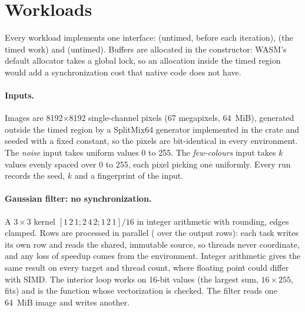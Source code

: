 \section{Workloads}
\label{sec:workloads}

Every workload implements one interface:  (untimed, before
each iteration),  (the timed work) and  (untimed).
Buffers are allocated in the constructor: WASM's default allocator takes a
global lock, so an allocation inside the timed region would add a
synchronization cost that native code does not have.

\paragraph{Inputs.} Images are 8192$\times$8192 single-channel 
pixels (67 megapixels, 64~MiB), generated outside the timed region by a
SplitMix64 generator implemented in the crate and seeded with a fixed
constant, so the pixels are bit-identical in every environment. The
\emph{noise} input takes uniform values 0 to 255. The \emph{few-colours}
input takes $k$ values evenly spaced over 0 to 255, each pixel picking one
uniformly. Every run records the seed, $k$ and a fingerprint of the input.

\paragraph{Gaussian filter: no synchronization.} A $3\times3$ kernel
$[1\,2\,1; 2\,4\,2; 1\,2\,1]/16$ in integer arithmetic with rounding, edges
clamped. Rows are processed in parallel ( over the
output rows): each task writes its own row and reads the shared, immutable
source, so threads never coordinate, and any loss of speedup comes from the
environment. Integer arithmetic gives the same result on every target and
thread count, where floating point could differ with SIMD. The interior
loop works on 16-bit values (the largest sum, $16\times255$, fits) and is
the function whose vectorization is checked. The filter reads one 64~MiB
image and writes another.

